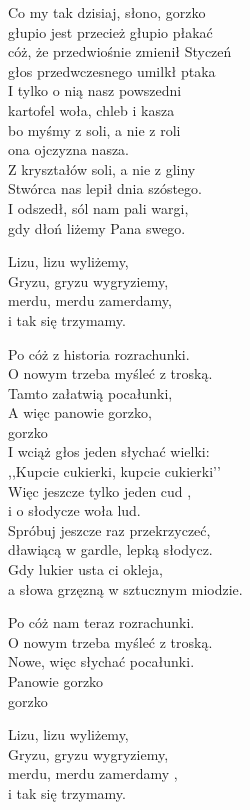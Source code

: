 \begin{text}
    Co my tak dzisiaj, słono, gorzko\\
    głupio jest przecież głupio płakać\\
    cóż, że przedwiośnie zmienił Styczeń\\
    głos przedwczesnego umilkł ptaka\\
    I tylko o nią nasz powszedni\\
    kartofel woła, chleb i kasza\\
    bo myśmy z soli, a nie z roli\\
    ona ojczyzna nasza.\\
    Z kryształów soli, a nie z gliny\\
    Stwórca nas lepił dnia szóstego.\\
    I odszedł, sól nam pali wargi,\\
    gdy dłoń liżemy Pana swego.

    Lizu, lizu wyliżemy,\\
    Gryzu, gryzu wygryziemy,\\
    merdu, merdu zamerdamy,\\
    i tak się trzymamy.

    Po cóż z historia rozrachunki.\\
    O nowym trzeba myśleć z troską.\\
    Tamto załatwią pocałunki,\\
    A więc panowie gorzko,\\
    gorzko\\
    I wciąż głos jeden słychać wielki:\\
    ,,Kupcie cukierki, kupcie cukierki’’\\
    Więc jeszcze tylko jeden cud ,\\
    i o słodycze woła lud.\\
    Spróbuj jeszcze raz przekrzyczeć,\\
    dławiącą w gardle, lepką słodycz.\\
    Gdy lukier usta ci okleja,\\
    a słowa grzęzną w sztucznym miodzie.

    Po cóż nam teraz rozrachunki.\\
    O nowym trzeba myśleć z troską.\\
    Nowe, więc słychać pocałunki.\\
    Panowie gorzko\\
    gorzko

    Lizu, lizu wyliżemy,\\
    Gryzu, gryzu wygryziemy,\\
    merdu, merdu zamerdamy ,\\
    i tak się trzymamy.
\end{text}
\begin{chord}

\end{chord}